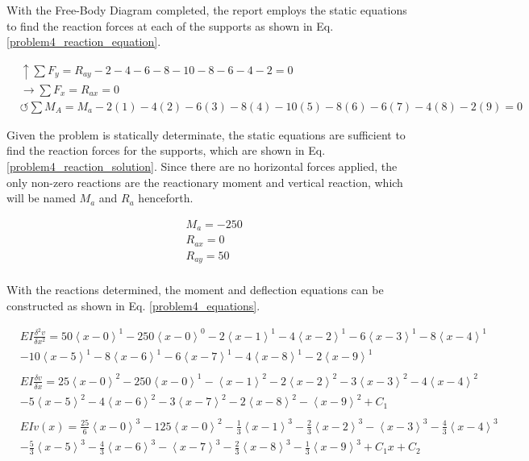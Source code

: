 \documentclass[a4paper]{article}
\begin{document}
With the Free-Body Diagram completed, the report employs the static equations to find the reaction forces at each of the supports as shown in Eq. \ref{problem4_reaction_equation}.

\begin{equation}
\begin{split}
	&\uparrow \sum F_y = R_{ay} -2 -4 -6 -8 -10 -8 -6 -4 -2 = 0 \\
 	&\rightarrow \sum F_x = R_{ax} = 0 \\
 	&\circlearrowleft \sum M_A = M_a -2(1) -4(2) -6(3) -8(4) -10(5) -8(6) -6(7)- 4(8) -2(9) = 0
\end{split}
\label{problem4_reaction_equation}
\end{equation}

Given the problem is statically determinate, the static equations are sufficient to find the reaction forces for the supports, which are shown in Eq. \ref{problem4_reaction_solution}. Since there are no horizontal forces applied, the only non-zero reactions are the reactionary moment and vertical reaction, which will be named $M_a$ and $R_a$ henceforth.

\begin{equation}
\begin{split}
	& M_a = -250 \\
	& R_{ax} = 0 \\
	& R_{ay} = 50 \\
\end{split}
\label{problem4_reaction_solution}
\end{equation}

With the reactions determined, the moment and deflection equations can be constructed as shown in Eq. \ref{problem4_equations}.

\begin{equation}
    \begin{split}
& EI \frac{\delta^2 v}{\delta x^2} = 50\left<x-0\right>^1 - 250\left<x-0\right>^0 - 2\left<x-1\right>^1 - 4\left<x-2\right>^1 - 6\left<x-3\right>^1 - 8\left<x-4\right>^1 \\
& - 10\left<x-5\right>^1 -  8\left<x-6\right>^1 - 6\left<x-7\right>^1 -  4\left<x-8\right>^1 - 2\left<x-9\right>^1 \\
& \\
& EI \frac{\delta v}{\delta x} = 25\left<x-0\right>^2 - 250\left<x-0\right>^1 - \left<x-1\right>^2 - 2\left<x-2\right>^2 - 3\left<x-3\right>^2 - 4\left<x-4\right>^2\\
& - 5\left<x-5\right>^2 -  4\left<x-6\right>^2 - 3\left<x-7\right>^2 -  2\left<x-8\right>^2 - \left<x-9\right>^2 + C_1 \\
& \\
& EI v(x) = \frac{25}{6}\left<x-0\right>^3 - 125\left<x-0\right>^2 - \frac{1}{3}\left<x-1\right>^3 - \frac{2}{3}\left<x-2\right>^3 - \left<x-3\right>^3 - \frac{4}{3}\left<x-4\right>^3\\
& - \frac{5}{3}\left<x-5\right>^3  -  \frac{4}{3}\left<x-6\right>^3 - \left<x-7\right>^3 -  \frac{2}{3}\left<x-8\right>^3 - \frac{1}{3}\left<x-9\right>^3  + C_1 x + C_2 \\
    \end{split}
\label{problem4_equations}
\end{equation}
\end{document}
